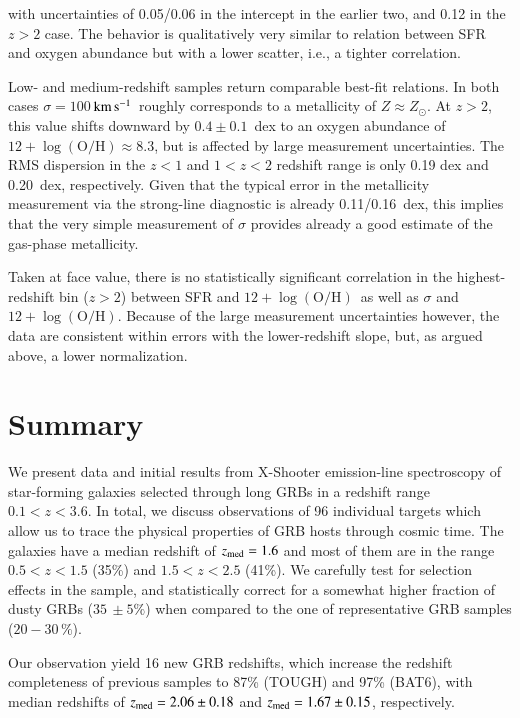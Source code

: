 \documentclass[traditabstract, longauth]{aa}
\newcommand{\kms}{$\rm{km\,s^{-1}}$}
\newcommand{\oh}{12+\log(\mathrm{O/H})}
\begin{document}
with uncertainties of 0.05/0.06 in the intercept in the earlier two, and 0.12 in the $z>2$ case. The behavior is qualitatively very similar to relation between SFR and oxygen abundance but with a lower scatter, i.e., a tighter correlation. 

Low- and medium-redshift samples return comparable best-fit relations. In both cases $\sigma=100$\,\kms\, roughly corresponds to a metallicity of $Z\approx Z_{\odot}$. At $z > 2$, this value shifts downward by $0.4\pm0.1$~dex to an oxygen abundance of $\oh \approx 8.3$, but is affected by large measurement uncertainties.  {The RMS dispersion in the $z<1$ and $1<z<2$ redshift range is only 0.19 dex and 0.20~dex, respectively. Given that the typical error in the metallicity measurement via the strong-line diagnostic is already 0.11/0.16~dex, this implies that the very simple measurement of $\sigma$ provides already a good estimate of the gas-phase metallicity.}

Taken at face value, there is no statistically significant correlation in the highest-redshift bin ($z>2$) between SFR and $\oh$\, as well as $\sigma$ and $\oh$. Because of the large measurement uncertainties however, the data are consistent within errors with the lower-redshift slope, but, as argued above, a lower normalization.

\section{Summary} 
\label{sec:conc}

We present data and initial results from X-Shooter emission-line spectroscopy of star-forming galaxies selected through long GRBs in a redshift range $0.1<z<3.6$. In total, we discuss observations of 96 individual targets which allow us to trace the physical properties of GRB hosts through cosmic time. The galaxies have a median redshift of $z_{\rm med}=1.6$ and most of them are in the range $0.5 < z < 1.5$ (35\%) and $1.5 < z < 2.5$ (41\%). We carefully test for selection effects in the sample, and statistically correct for a somewhat higher fraction of dusty GRBs ($35\,\pm5\%$) when compared to the one of representative GRB samples ($20-30\,\%$). 

Our observation yield 16 new GRB redshifts, which increase the redshift completeness of previous samples to 87\% (TOUGH) and 97\% (BAT6), with median redshifts of $z_{\rm{med}} = 2.06\pm0.18$ and $z_{\rm{med}} = 1.67\pm0.15$, respectively.
\end{document}
